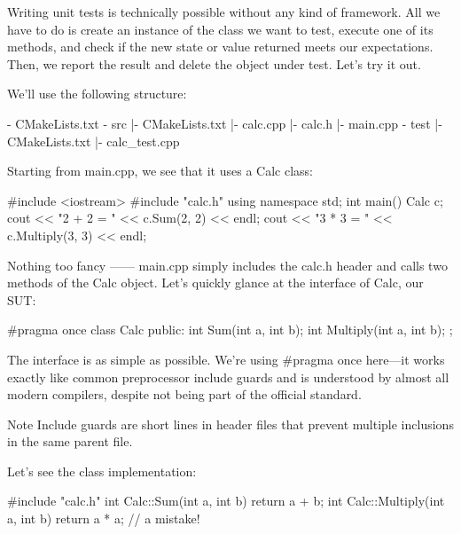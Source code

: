 Writing unit tests is technically possible without any kind of framework. All we have to do is create an instance of the class we want to test, execute one of its methods, and check if the new state or value returned meets our expectations. Then, we report the result and delete the object under test. Let’s try it out.

We’ll use the following structure:

\begin{shell}
- CMakeLists.txt
- src
  |- CMakeLists.txt
  |- calc.cpp
  |- calc.h
  |- main.cpp
- test
  |- CMakeLists.txt
  |- calc_test.cpp
\end{shell}

Starting from main.cpp, we see that it uses a Calc class:


\begin{cpp}
#include <iostream>
#include "calc.h"
using namespace std;
int main() {
    Calc c;
    cout << "2 + 2 = " << c.Sum(2, 2) << endl;
    cout << "3 * 3 = " << c.Multiply(3, 3) << endl;
}
\end{cpp}

Nothing too fancy —— main.cpp simply includes the calc.h header and calls two methods of the Calc object. Let’s quickly glance at the interface of Calc, our SUT:


\begin{cpp}
#pragma once
class Calc {
    public:
    int Sum(int a, int b);
    int Multiply(int a, int b);
};
\end{cpp}

The interface is as simple as possible. We’re using \#pragma once here—it works exactly like common preprocessor include guards and is understood by almost all modern compilers, despite not being part of the official standard.

\begin{myNotic}{Note}
Include guards are short lines in header files that prevent multiple inclusions in the same parent file.
\end{myNotic}

Let’s see the class implementation:


\begin{cpp}
#include "calc.h"
int Calc::Sum(int a, int b) {
    return a + b;
}
int Calc::Multiply(int a, int b) {
    return a * a; // a mistake!
}
\end{cpp}

